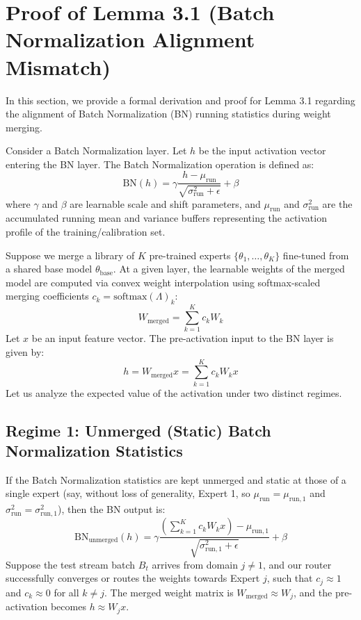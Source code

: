 \documentclass{article}
\theoremstyle{plain}
\theoremstyle{definition}
\theoremstyle{remark}
\begin{document}
\section{Proof of Lemma 3.1 (Batch Normalization Alignment Mismatch)}
\label{app:bn_proof}
In this section, we provide a formal derivation and proof for Lemma 3.1 regarding the alignment of Batch Normalization (BN) running statistics during weight merging.

Consider a Batch Normalization layer. Let $h$ be the input activation vector entering the BN layer. The Batch Normalization operation is defined as:
\begin{equation}
    \text{BN}(h) = \gamma \frac{h - \mu_{\text{run}}}{\sqrt{\sigma^2_{\text{run}} + \epsilon}} + \beta
\end{equation}
where $\gamma$ and $\beta$ are learnable scale and shift parameters, and $\mu_{\text{run}}$ and $\sigma^2_{\text{run}}$ are the accumulated running mean and variance buffers representing the activation profile of the training/calibration set.

Suppose we merge a library of $K$ pre-trained experts $\{\theta_1, \dots, \theta_K\}$ fine-tuned from a shared base model $\theta_{\text{base}}$. At a given layer, the learnable weights of the merged model are computed via convex weight interpolation using softmax-scaled merging coefficients $c_k = \text{softmax}(\Lambda)_k$:
\begin{equation}
    W_{\text{merged}} = \sum_{k=1}^K c_k W_k
\end{equation}
Let $x$ be an input feature vector. The pre-activation input to the BN layer is given by:
\begin{equation}
    h = W_{\text{merged}} x = \sum_{k=1}^K c_k W_k x
\end{equation}
Let us analyze the expected value of the activation under two distinct regimes.

\subsection{Regime 1: Unmerged (Static) Batch Normalization Statistics}
If the Batch Normalization statistics are kept unmerged and static at those of a single expert (say, without loss of generality, Expert 1, so $\mu_{\text{run}} = \mu_{\text{run}, 1}$ and $\sigma^2_{\text{run}} = \sigma^2_{\text{run}, 1}$), then the BN output is:
\begin{equation}
    \text{BN}_{\text{unmerged}}(h) = \gamma \frac{\left( \sum_{k=1}^K c_k W_k x \right) - \mu_{\text{run}, 1}}{\sqrt{\sigma^2_{\text{run}, 1} + \epsilon}} + \beta
\end{equation}
Suppose the test stream batch $B_t$ arrives from domain $j \neq 1$, and our router successfully converges or routes the weights towards Expert $j$, such that $c_j \approx 1$ and $c_k \approx 0$ for all $k \neq j$. The merged weight matrix is $W_{\text{merged}} \approx W_j$, and the pre-activation becomes $h \approx W_j x$.
\end{document}
